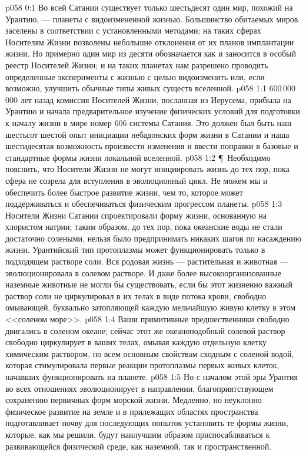 \vs p058 0:1 Во всей Сатании существует только шестьдесят один мир, похожий на Урантию, --- планеты с видоизмененной жизнью. Большинство обитаемых миров заселены в соответствии с установленными методами; на таких сферах Носителям Жизни позволены небольшие отклонения от их планов имплантации жизни. Но примерно один мир из десяти обозначается как  и заносится в особый реестр Носителей Жизни; и на таких планетах нам разрешено проводить определенные эксперименты с жизнью с целью видоизменить или, если возможно, улучшить обычные типы живых существ вселенной.
\vs p058 1:1 600\,000\,000 лет назад комиссия Носителей Жизни, посланная из Иерусема, прибыла на Урантию и начала предварительное изучение физических условий для подготовки к началу жизни в мире номер 606 системы Сатания. Это должен был быть наш шестьсот шестой опыт инициации небадонских форм жизни в Сатании и наша шестидесятая возможность произвести изменения и ввести поправки в базовые и стандартные формы жизни локальной вселенной.
\vs p058 1:2 \P\ Необходимо пояснить, что Носители Жизни не могут инициировать жизнь до тех пор, пока сфера не созрела для вступления в эволюционный цикл. Не можем мы и обеспечить более быстрое развитие жизни, чем то, которое может поддерживаться и обеспечиваться физическим прогрессом планеты.
\vs p058 1:3 Носители Жизни Сатании спроектировали форму жизни, основанную на хлористом натрии; таким образом, до тех пор, пока океанские воды не стали достаточно солеными, нельзя было предпринимать никаких шагов по насаждению жизни. Урантийский тип протоплазмы может функционировать только в подходящем растворе соли. Вся родовая жизнь --- растительная и животная --- эволюционировала в солевом растворе. И даже более высокоорганизованные наземные животные не могли бы существовать, если бы этот жизненно важный раствор соли не циркулировал в их телах в виде потока крови, свободно омывающей, буквально затопляющей каждую мельчайшую живую клетку в этом <<соленом море>>.
\vs p058 1:4 Ваши примитивные предшественники свободно двигались в соленом океане; сейчас этот же океаноподобный солевой раствор свободно циркулирует в ваших телах, омывая каждую отдельную клетку химическим раствором, по всем основным свойствам сходным с соленой водой, которая стимулировала первые реакции протоплазмы первых живых клеток, начавших функционировать на планете.
\vs p058 1:5 Но с началом этой эры Урантия во всех отношениях эволюционирует в направлении, благоприятствующем сохранению первичных форм морской жизни. Медленно, но неуклонно физическое развитие на земле и в прилежащих областях пространства подготавливает почву для последующих попыток установить те формы жизни, которые, как мы решили, будут наилучшим образом приспосабливаться к развивающейся физической среде, как наземной, так и пространственной.
